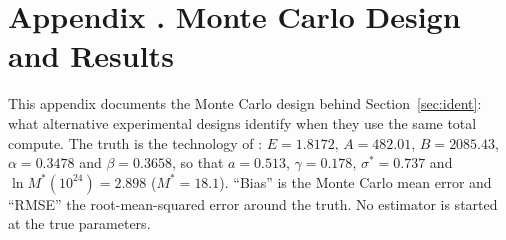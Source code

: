 
\section[Monte Carlo Design and Results]{Appendix \thesection. Monte Carlo Design and Results}\label{app:mc}
\setlength{\emergencystretch}{2em}%

This appendix documents the Monte Carlo design behind Section~\ref{sec:ident}: what alternative experimental designs
identify when they use the same total compute. The truth is the technology of \citet{besiroglu2024chinchilla}:
$E=1.8172$, $A=482.01$, $B=2085.43$, $\alpha=0.3478$ and $\beta=0.3658$, so that $a=0.513$, $\gamma=0.178$,
$\sigma^*=0.737$ and $\ln M^*(10^{24})=2.898$ ($M^*=18.1$). ``Bias'' is the Monte Carlo mean error and ``RMSE'' the
root-mean-squared error around the truth. No estimator is started at the true parameters.

